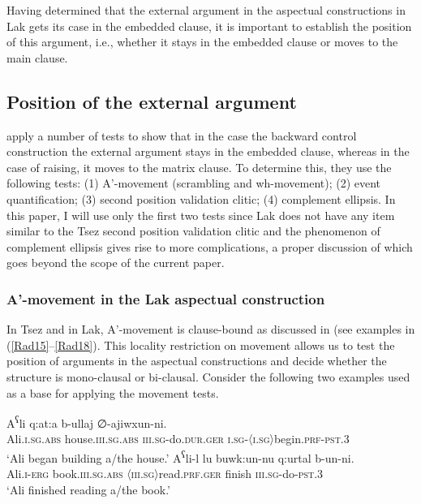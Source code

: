 \documentclass[output=paper]{langscibook}
\begin{document}
Having determined that the external argument in the aspectual constructions in Lak gets its case in the embedded clause, it is important to establish the position of this argument, i.e., whether it stays in the embedded clause or moves to the main clause.

\subsection{Position of the external argument}
\citet{PolinskyPotsdam2002} apply a number of tests to show that in the case the backward control construction the external argument stays in the embedded clause, whereas in the case of raising, it moves to the matrix clause. To determine this, they use the following tests: (1) A'-movement (scrambling and wh-movement); (2) event quantification; (3) second position validation clitic; (4) complement ellipsis. In this paper, I will use only the first two tests since Lak does not have any item similar to the Tsez second position validation clitic and the phenomenon of complement ellipsis gives rise to more complications, a proper discussion of which goes beyond the scope of the current paper.

\subsubsection{A'-movement in the Lak aspectual construction}\label{Radsect:3.2.1}
In Tsez and in Lak, A'-movement is clause-bound as discussed in  (see examples in (\ref{Rad15}--\ref{Rad18}).  This locality restriction on movement allows us to test the position of arguments in the aspectual constructions and decide whether the structure is mono-clausal or bi-clausal. Consider the following two examples used as a base for applying the movement tests.

\ea\label{Rad29}
\gll A\textsuperscript{ʕ}li q:at:a b-ullaj ∅-ajiwxun-ni.\\
Ali.\textsc{i.sg.abs} house.\textsc{iii.sg.abs} \textsc{iii.sg}-do.\textsc{dur.ger} \textsc{i.sg-〈i.sg〉}begin.\textsc{prf-pst.3}\\
\glt ‘Ali began building a/the house.’
\ex\label{Rad30}
\gll A\textsuperscript{ʕ}li-l lu buwk:un-nu q:urtal b-un-ni.\\
 Ali.\textsc{i-erg} book.\textsc{iii.sg.abs} \textsc{〈iii.sg〉}read.\textsc{prf.ger} finish \textsc{iii.sg}-do-\textsc{pst.3}\\
\glt ‘Ali finished reading a/the book.’
\z 
\end{document}
